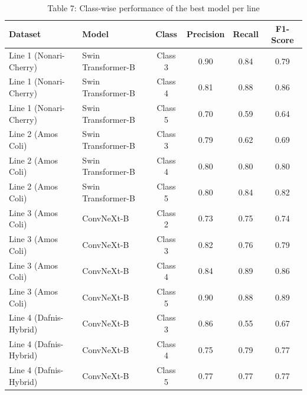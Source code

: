 \begin{table}[ht]
\centering
\caption{Table 7: Class-wise performance of the best model per line}
\begin{tabular}{llcccc}
\hline
Dataset & Model & Class & Precision & Recall & F1-Score \\
\hline
Line 1 (Nonari-Cherry) & Swin Transformer-B & Class 3 & 0.90 & 0.84 & 0.79 \\
Line 1 (Nonari-Cherry) & Swin Transformer-B & Class 4 & 0.81 & 0.88 & 0.86 \\
Line 1 (Nonari-Cherry) & Swin Transformer-B & Class 5 & 0.70 & 0.59 & 0.64 \\
Line 2 (Amos Coli) & Swin Transformer-B & Class 3 & 0.79 & 0.62 & 0.69 \\
Line 2 (Amos Coli) & Swin Transformer-B & Class 4 & 0.80 & 0.80 & 0.80 \\
Line 2 (Amos Coli) & Swin Transformer-B & Class 5 & 0.80 & 0.84 & 0.82 \\
Line 3 (Amos Coli) & ConvNeXt-B & Class 2 & 0.73 & 0.75 & 0.74 \\
Line 3 (Amos Coli) & ConvNeXt-B & Class 3 & 0.82 & 0.76 & 0.79 \\
Line 3 (Amos Coli) & ConvNeXt-B & Class 4 & 0.84 & 0.89 & 0.86 \\
Line 3 (Amos Coli) & ConvNeXt-B & Class 5 & 0.90 & 0.88 & 0.89 \\
Line 4 (Dafnis-Hybrid) & ConvNeXt-B & Class 3 & 0.86 & 0.55 & 0.67 \\
Line 4 (Dafnis-Hybrid) & ConvNeXt-B & Class 4 & 0.75 & 0.79 & 0.77 \\
Line 4 (Dafnis-Hybrid) & ConvNeXt-B & Class 5 & 0.77 & 0.77 & 0.77 \\
\hline
\end{tabular}
\end{table}
